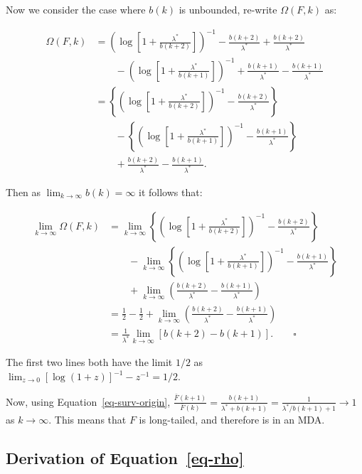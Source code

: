 \documentclass[
  sn-basic,
  10pt,
]{sn-jnl}
\theoremstyle{plain}
\theoremstyle{plain}
\theoremstyle{remark}
\begin{document}
Now we consider the case where \(b(k)\) is unbounded, re-write
\(\Omega(F,k)\) as:

\begin{align*}
\Omega(F,k) &= \left(\log\left[1+\frac{\lambda^{*}}{b(k+2)}\right]\right)^{-1}-\frac{b(k+2)}{\lambda^{*}}+\frac{b(k+2)}{\lambda^{*}}\\&\qquad  -\left(\log\left[1+\frac{\lambda^{*}}{b(k+1)}\right]\right)^{-1}+\frac{b(k+1)}{\lambda^{*}}-\frac{b(k+1)}{\lambda^{*}}\\
&=\left\{ \left(\log\left[1+\frac{\lambda^{*}}{b(k+2)}\right]\right)^{-1}-\frac{b(k+2)}{\lambda^{*}}\right\}\\ &\qquad  - \left\{ \left(\log\left[1+\frac{\lambda^{*}}{b(k+1)}\right]\right)^{-1}-\frac{b(k+1)}{\lambda^{*}}\right\}\\&\qquad  +\frac{b(k+2)}{\lambda^{*}}-\frac{b(k+1)}{\lambda^{*}}.
\end{align*}

Then as \(\lim_{k\rightarrow\infty}b(k)=\infty\) it follows that:

\begin{align*}
\lim_{k\rightarrow\infty}\Omega(F,k) &= \lim_{k\rightarrow\infty}\left\{ \left(\log\left[1+\frac{\lambda^{*}}{b(k+2)}\right]\right)^{-1}-\frac{b(k+2)}{\lambda^{*}}\right\} \\&\qquad - \lim_{k\rightarrow\infty}\left\{ \left(\log\left[1+\frac{\lambda^{*}}{b(k+1)}\right]\right)^{-1}-\frac{b(k+1)}{\lambda^{*}}\right\}\\
&\qquad +\lim_{k\rightarrow\infty}\left(\frac{b(k+2)}{\lambda^{*}}-\frac{b(k+1)}{\lambda^{*}}\right)\\
&=\frac{1}{2}-\frac{1}{2} + \lim_{k\rightarrow\infty}\left(\frac{b(k+2)}{\lambda^{*}}-\frac{b(k+1)}{\lambda^{*}}\right)\\
&=\frac{1}{\lambda^{*}}\lim_{k\rightarrow\infty}\left[b(k+2)-b(k+1)\right].\qquad  \square
\end{align*}

The first two lines both have the limit \(1/2\) as
\(\lim_{z\rightarrow{}0}\left[\log(1+z)\right]^{-1}-z^{-1} = 1/2\).

Now, using Equation~\ref{eq-surv-origin},
\(\frac{\bar{F}(k+1)}{\bar{F}(k)}=\frac{b(k+1)}{\lambda^{*}+b(k+1)}=\frac{1}{\lambda^{*}/b(k+1) + 1}\rightarrow{}1\)
as \(k\rightarrow\infty\). This means that \(F\) is long-tailed, and
therefore is in an MDA.

\subsection{\texorpdfstring{Derivation of
Equation~\ref{eq-rho}}{Derivation of Equation~}}\label{derivation-of-eq-rho}
\end{document}

